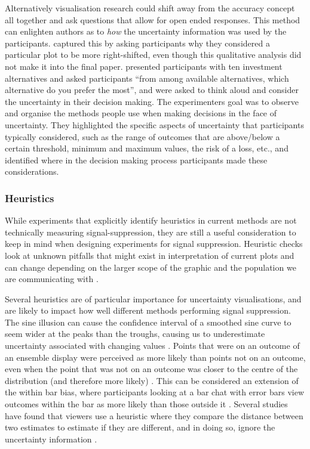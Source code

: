\documentclass[
  12pt]{article}
\begin{document}
Alternatively visualisation research could shift away from the accuracy
concept all together and ask questions that allow for open ended
responses. This method can enlighten authors as to \emph{how} the
uncertainty information was used by the participants.
\citet{Hofmann2012} captured this by asking participants why they
considered a particular plot to be more right-shifted, even though this
qualitative analysis did not make it into the final paper.
\citet{Daradkeh2015} presented participants with ten investment
alternatives and asked participants ``from among available alternatives,
which alternative do you prefer the most'', and were asked to think
aloud and consider the uncertainty in their decision making. The
experimenters goal was to observe and organise the methods people use
when making decisions in the face of uncertainty. They highlighted the
specific aspects of uncertainty that participants typically considered,
such as the range of outcomes that are above/below a certain threshold,
minimum and maximum values, the risk of a loss, etc., and identified
where in the decision making process participants made these
considerations.

\subsubsection{Heuristics}\label{heuristics}

While experiments that explicitly identify heuristics in current methods
are not technically measuring signal-suppression, they are still a
useful consideration to keep in mind when designing experiments for
signal suppression. Heuristic checks look at unknown pitfalls that might
exist in interpretation of current plots \citep{Hullman2016} and can
change depending on the larger scope of the graphic and the population
we are communicating with \citep{Spiegelhalter2017, Kinkeldey2014}.

Several heuristics are of particular importance for uncertainty
visualisations, and are likely to impact how well different methods
performing signal suppression. The sine illusion can cause the
confidence interval of a smoothed sine curve to seem wider at the peaks
than the troughs, causing us to underestimate uncertainty associated
with changing values \citep{Vanderplas2015}. Points that were on an
outcome of an ensemble display were perceived as more likely than points
not on an outcome, even when the point that was not on an outcome was
closer to the centre of the distribution (and therefore more likely)
\citep{Padilla2017}. This can be considered an extension of the within
bar bias, where participants looking at a bar chat with error bars view
outcomes within the bar as more likely than those outside it
\citep{Newman2012}. Several studies have found that viewers use a
heuristic where they compare the distance between two estimates to
estimate if they are different, and in doing so, ignore the uncertainty
information \citep{uncertchap2022}.
\end{document}
